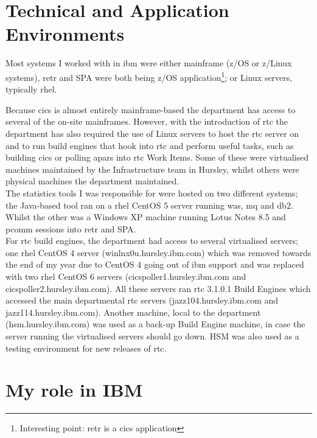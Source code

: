 \documentclass[a4paper,11pt]{report}
\begin{document}
\chapter{Technical and Application Environments}

Most systems I worked with in \gls{ibm} were either mainframe (z/OS or z/Linux systems), \gls{retr}
and SPA were both being z/OS application\footnote{Interesting point: \gls{retr} is a \gls{cics} 
application}; or Linux servers, typically \gls{rhel}.

Because \gls{cics} is almost entirely mainframe-based the department has access to several of the
on-site mainframes. However, with the introduction of \gls{rtc} the department has also required
the use of Linux servers to host the \gls{rtc} server on and to run build engines that hook into
\gls{rtc} and perform useful tasks, such as building \gls{cics} or polling \gls{apar}s into 
\gls{rtc} Work Items. Some of these were virtualised machines maintained by the Infrastructure team
in Hursley, whilst others were physical machines the department maintained. \\



The statistics tools I was responsible for were hosted on two different systems; the Java-based
tool ran on a \gls{rhel} CentOS 5 server running \gls{was}, \gls{mq} and \gls{db2}. Whilst the 
other was a Windows XP machine running Lotus Notes 8.5 and \gls{pcomm} sessions into \gls{retr} and
SPA. \\



For \gls{rtc} build engines, the department had access to several virtualised servers; one 
\gls{rhel} CentOS 4 server (winlnx0u.hursley.ibm.com) which was removed towards the end of my year
due to CentOS 4 going out of \gls{ibm} support and was replaced with two \gls{rhel} CentOS 6 
servers (cicspoller1.hursley.ibm.com and cicspoller2.hursley.ibm.com). All these servers ran 
\gls{rtc} 3.1.0.1 Build Engines which accessed the main departmental \gls{rtc} servers
(jazz104.hursley.ibm.com and jazz114.hursley.ibm.com). Another machine, local to the department
(hsm.hursley.ibm.com) was used as a back-up Build Engine machine, in case the server running the
virtualised servers should go down. HSM was also used as a testing environment for new releases of
\gls{rtc}.


\chapter{My role in IBM}
\end{document}
